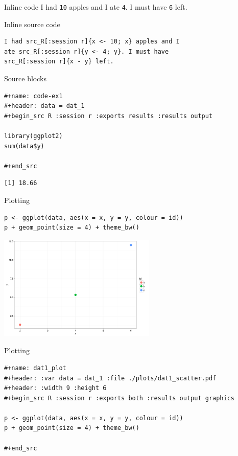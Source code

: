 \documentclass[aspectratio=169,presentation,bigger,fleqn,t]{beamer}
\begin{document}
\begin{frame}[fragile,label={sec:orgheadline15}]{Inline code}
 I had \texttt{10} apples and I ate \texttt{4}. I must
have \texttt{6} left.
\end{frame}

\begin{frame}[fragile,label={sec:orgheadline16}]{Inline source code}
 \begin{verbatim}
I had src_R[:session r]{x <- 10; x} apples and I
ate src_R[:session r]{y <- 4; y}. I must have
src_R[:session r]{x - y} left.
\end{verbatim}
\end{frame}


\begin{frame}[fragile,label={sec:orgheadline17}]{Source blocks}
 \begin{verbatim}
#+name: code-ex1
#+header: data = dat_1
#+begin_src R :session r :exports results :results output

library(ggplot2)
sum(data$y)

#+end_src
\end{verbatim}

\begin{verbatim}
[1] 18.66
\end{verbatim}
\end{frame}


\begin{frame}[fragile,label={sec:orgheadline18}]{Plotting}
 \begin{verbatim}
p <- ggplot(data, aes(x = x, y = y, colour = id))
p + geom_point(size = 4) + theme_bw()
\end{verbatim}

\begin{center}
\includegraphics[height=5cm]{./plots/dat1_scatter.pdf}
\end{center}
\end{frame}

\begin{frame}[fragile,label={sec:orgheadline19}]{Plotting}
 \begin{verbatim}
#+name: dat1_plot
#+header: :var data = dat_1 :file ./plots/dat1_scatter.pdf
#+header: :width 9 :height 6
#+begin_src R :session r :exports both :results output graphics

p <- ggplot(data, aes(x = x, y = y, colour = id))
p + geom_point(size = 4) + theme_bw()

#+end_src
\end{verbatim}
\end{frame}
\end{document}
